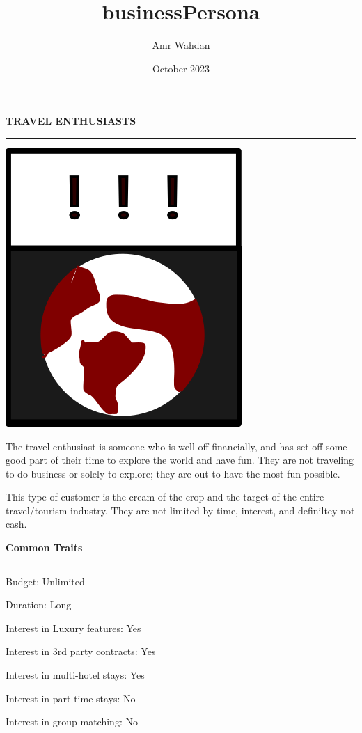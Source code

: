 \documentclass[12pt]{article}
\title{businessPersona}
\author{Amr Wahdan}
\date{October 2023}
\begin{document}
{\Huge\bfseries TRAVEL ENTHUSIASTS} \\
\hrule
\vspace{3em}
\begin{minipage}{0.45\textwidth}
    \includegraphics[scale=0.7]{enthu.png}
\end{minipage}
\begin{minipage}{0.5\textwidth}
    \begin{flushleft}
    \large
    The travel enthusiast is someone who is well-off financially, and has set off some good part of their time to explore the world and have fun. They are not traveling to do business or solely to explore; they are out to have the most fun possible. \par 
    \vspace{1em}
    This type of customer is the cream of the crop and the target of the entire travel/tourism industry. They are not limited by time, interest, and definiltey not cash.
    \end{flushleft}
\end{minipage}

\vspace{6em}

{\Huge\bfseries Common Traits} \\
\hrule
\Large
\begin{tcolorbox}
    Budget: Unlimited
\end{tcolorbox}
\begin{tcolorbox}
    Duration: Long
\end{tcolorbox}
\begin{tcolorbox}
    Interest in Luxury features: Yes
\end{tcolorbox}
\begin{tcolorbox}
    Interest in 3rd party contracts: Yes
\end{tcolorbox}
\begin{tcolorbox}
    Interest in multi-hotel stays: Yes
\end{tcolorbox}
\begin{tcolorbox}[colback=red!10!white]
    Interest in part-time stays: No
\end{tcolorbox}
\begin{tcolorbox}[colback=red!10!white]
    Interest in group matching: No
\end{tcolorbox}
\end{document}
